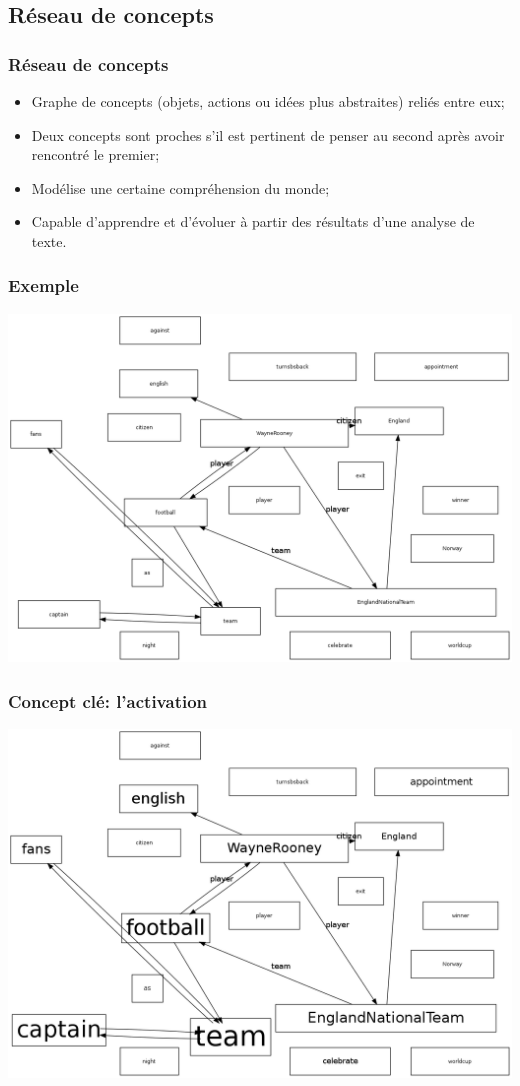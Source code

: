 \documentclass{beamer}
\begin{document}
    \subsection{Réseau de concepts}
        \begin{frame}
        \frametitle{Réseau de concepts}
            \begin{itemize}
                \item Graphe de concepts (objets, actions ou idées plus abstraites) reliés entre eux;
                \item Deux concepts sont proches s'il est pertinent de penser au second après avoir rencontré le premier;
                \item Modélise une certaine compréhension du monde;
                \item Capable d'apprendre et d'évoluer à partir des résultats d'une analyse de texte.
            \end{itemize}
        \end{frame}

        \begin{frame}
        \frametitle{Exemple}
            \includegraphics[height=0.8\textheight]{RC/figures/RCetape0.png}
        \end{frame}

        \begin{frame}
        \frametitle{Concept clé: l'activation}
            \includegraphics[height=0.8\textheight]{RC/figures/RCetape30.png}
        \end{frame}
\end{document}
